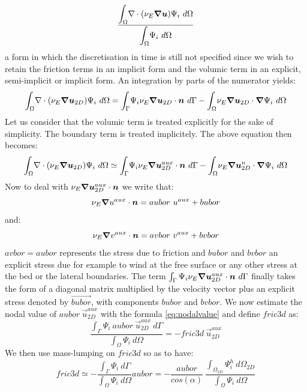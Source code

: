 \begin{equation}
\dfrac{\displaystyle{\int_{\Omega}}\nabla \cdot(\nu_{E}\bm{\nabla}\bm{u})\Psi_{i}~d\Omega}
{\displaystyle{\int_{\Omega}}\Psi_{i}~d\Omega}
\end{equation}
a form in which the discretisation in time is still not specified since we
wish to retain the friction terms in an implicit form and the volumic term in an
explicit, semi-implicit or implicit form.
An integration by parts of the numerator yields:
\begin{equation}
\displaystyle{\int_{\Omega}}\nabla \cdot(\nu_{E}\bm{\nabla}\bm{u}_{2D})\Psi_{i}~d\Omega=
\displaystyle{\int_{\Gamma}}\Psi_{i}\nu_{E}\bm{\nabla}\bm{u}_{2D}\cdot\bm{n}~d\Gamma-
\displaystyle{\int_{\Omega}}\nu_{E}\bm{\nabla}\bm{u}_{2D}\cdot\bm{\nabla}\Psi_{i}~d\Omega
\end{equation}
Let us consider that the volumic
term is treated explicitly for the sake of simplicity.
The boundary term is treated implicitely.
The above equation then becomes:
\begin{equation}
\displaystyle{\int_{\Omega}}\nabla \cdot(\nu_{E}\bm{\nabla}\bm{u}_{2D})\Psi_{i}~d\Omega\simeq
\displaystyle{\int_{\Gamma}}\Psi_{i}\nu_{E}\bm{\nabla}\bm{u}_{2D}^{aux}\cdot\bm{n}~d\Gamma
-\displaystyle{\int_{\Omega}}\nu_{E}\bm{\nabla}\bm{u}_{2D}^{n}\cdot\bm{\nabla}\Psi_{i}~d\Omega
\end{equation}
Now to deal with $\nu_{E}\bm{\nabla}\bm{u}_{2D}^{aux}\cdot\bm{n}$ we write that:
\begin{equation}
\nu_{E}\bm{\nabla} u^{aux}\cdot\bm{n}=aubor~u^{aux}+bubor
\end{equation}
and:
\begin{equation}
\nu_{E}\bm{\nabla} v^{aux}\cdot\bm{n} = avbor~v^{aux}+bvbor
\end{equation}
$avbor=aubor$ represents the stress due to friction and $bubor$ and $bvbor$ an
explicit stress due for example to wind at the free surface or any other
stress at the bed or the lateral boundaries.
The term $\int_{\Gamma}\Psi_{i}\nu_{E}\bm{\nabla}\bm{u}_{2D}^{aux}\cdot\bm{n}~d\Gamma$
finally takes the form of a diagonal matrix multiplied
by the velocity vector plus an explicit stress denoted by $\vec{bubor}$,
with components $bubor$ and $bvbor$. We now
estimate the nodal value of $aubor~\vec{u}_{2D}^{aux}$ with the formula
\eqref{eq:nodalvalue} and define $fric3d$ as:
\begin{equation}
\dfrac{\displaystyle{\int_{\Gamma}}\Psi_{i}~aubor~\vec{u}_{2D}^{aux}~d\Gamma}
{\displaystyle{\int_{\Omega}}\Psi_{i}~d\Omega}=-fric3d~\vec{u}_{2D}^{aux}
\end{equation}
We then use mass-lumping on $fric3d$ so as to have:
\begin{equation}
fric3d\simeq-\dfrac{\displaystyle{\int_{\Gamma}}\Psi_{i}~d\Gamma}
{\displaystyle{\int_{\Omega}}\Psi_{i}~d\Omega} aubor =
-\dfrac{aubor}{cos(\alpha)}~\dfrac{\displaystyle{\int_{\Omega_{2D}}}\Psi_{i}^{h}~d\Omega_{2D}}
{\displaystyle{\int_{\Omega}}\Psi_{i}~d\Omega}%
\end{equation}

